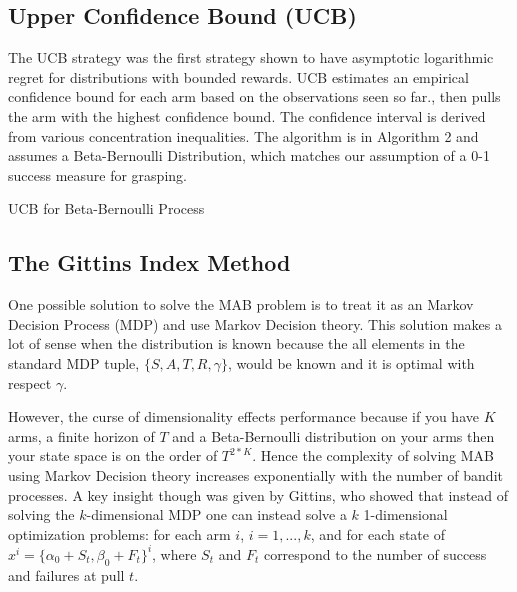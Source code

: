 \documentclass[journal,transmag]{IEEEtran}%
\begin{document}
\subsection{Upper Confidence Bound (UCB)}
The UCB strategy was the first strategy shown to have asymptotic logarithmic regret \cite{lai1985asymptotically} for distributions with bounded rewards. UCB estimates an empirical confidence bound for each arm based on the observations seen so far., then pulls the arm with the highest confidence bound. The confidence interval is derived from various concentration inequalities. The algorithm is in Algorithm 2 and assumes a Beta-Bernoulli Distribution, which matches our assumption of a 0-1 success measure for grasping. 

\begin{algorithm}
 \caption{UCB for Beta-Bernoulli Process}
\end{algorithm}

\subsection{The Gittins Index Method} 
One possible solution to solve the MAB problem is to treat it as an Markov Decision Process (MDP) and use Markov Decision theory. This solution makes a lot of sense when the distribution is known because the all elements in the standard MDP tuple, $\lbrace S,A,T,R,\gamma \rbrace$, would be known and it is optimal with respect $\gamma$. 

However, the curse of dimensionality effects performance because if you have $K$ arms, a finite horizon of $T$ and a Beta-Bernoulli distribution on your arms then your state space is on the order of $T^{2*K}$. Hence the complexity of solving MAB using Markov Decision theory increases exponentially with the number of bandit processes. A key insight though was given by Gittins, who showed that instead of solving the $k$-dimensional MDP one can instead solve a $k$ 1-dimensional optimization problems: for each arm $i$, $i= 1,...,k$, and for each state of $x^i = \lbrace \alpha_0 +S_t, \beta_0 +F_t \rbrace^i$, where $S_t$ and $F_t$ correspond to the number of success and failures at pull $t$. 
\end{document}
